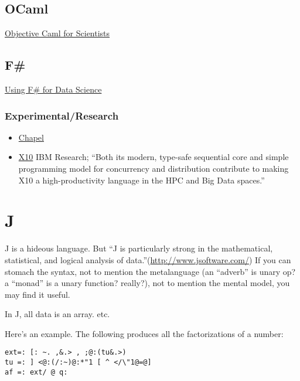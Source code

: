 \documentclass[reqno,12pt]{tufte-book}
\numberwithin{equation}{subsection}
\begin{document}
\section{OCaml}
\label{sect:ocaml}

\href{http://www.ffconsultancy.com/products/ocaml_for_scientists/chapter1.html}{Objective Caml for Scientists}

\section{F\#}
\label{sect:fsharp}

\href{http://fsharp.org/data-science/}{Using F\# for Data Science}

\subsection{Experimental/Research}
\label{subs:expersch}

\begin{itemize}
\item \href{http://chapel.cray.com/overview.html}{Chapel}
\item \href{http://x10-lang.org/}{X10} IBM Research; ``Both its modern, type-safe sequential core and simple programming model for concurrency and distribution contribute to making X10 a high-productivity language in the HPC and Big Data spaces.''
\end{itemize}

\chapter{J}

J is a hideous language.  But ``J is particularly strong in the
mathematical, statistical, and logical analysis of
data.''(\url{http://www.jsoftware.com/}) If you can stomach the
syntax, not to mention the metalanguage (an ``adverb'' is unary op? a
``monad'' is a unary function? really?), not to mention the mental
model, you may find it useful.

In J, all data is an array.  etc.

Here's an example.  The following produces all the factorizations of a
number:

\begin{verbatim}
ext=: [: ~. ,&.> , ;@:(tu&.>)
tu =: ] <@:(/:~)@:*"1 [ ^ </\"1@=@]
af =: ext/ @ q:
\end{verbatim}
\end{document}
